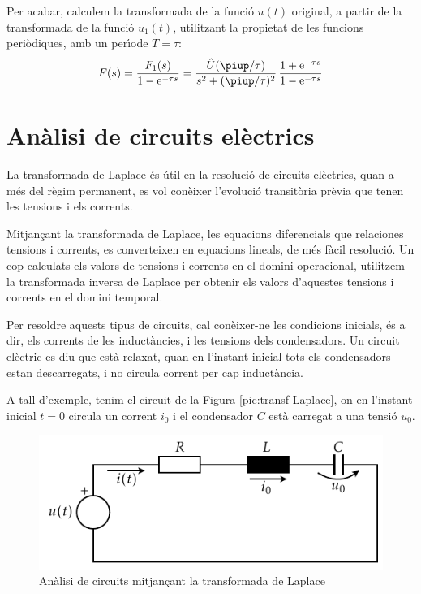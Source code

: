 \begin{exemple}
Per acabar, calculem la transformada de la funci\'{o} $u(t)$ original, a
partir de la transformada de la funci\'{o} $u_1(t)$, utilitzant la
propietat de les funcions peri\`{o}diques, amb un per\'{\i}ode $T=\tau$:
\[
    F(s) = \frac{F_1(s)}{1-\eu^{-\tau s}} =
    \frac{\hat{U} (\piup/\tau) }{s^2 + (\piup/\tau)^2}\,\frac{1+\eu^{-\tau s}}{1-\eu^{-\tau
    s}}
\]

\end{exemple}

\section{An\`{a}lisi de circuits el\`{e}ctrics}

La transformada de Laplace \'{e}s \'{u}til en la resoluci\'{o} de circuits
el\`{e}ctrics, quan a m\'{e}s del r\`{e}gim permanent, es vol con\`{e}ixer
l'evoluci\'{o} transit\`{o}ria pr\`{e}via que tenen les tensions i els corrents.

Mitjan\c{c}ant la transformada de Laplace, les equacions diferencials
que relaciones tensions i corrents, es converteixen en equacions
lineals, de m\'{e}s f\`{a}cil resoluci\'{o}. Un cop calculats els valors de
tensions i corrents en el domini operacional, utilitzem la
transformada inversa de Laplace per obtenir els valors d'aquestes
tensions i corrents en el domini temporal.

Per resoldre aquests tipus de circuits, cal con\`{e}ixer-ne les
condicions inicials, \'{e}s a dir, els corrents de les induct\`{a}ncies, i
les tensions dels condensadors. Un circuit el\`{e}ctric es diu que est\`{a}
relaxat, quan en l'instant inicial tots els condensadors estan
descarregats, i no circula corrent per cap induct\`{a}ncia.

A tall d'exemple, tenim el circuit de la Figura
\vref{pic:transf-Laplace}, on en l'instant inicial $t=0$ circula un
corrent $i_0$ i el condensador $C$ est\`{a} carregat a una tensi\'{o} $u_0$.
\begin{figure}[h]
\centering
    \includegraphics{Imatges/Cap-Laplace-Circuit-RLC.pdf}
\caption{An\`{a}lisi de circuits mitjan\c{c}ant la transformada de Laplace}
\label{pic:transf-Laplace}
\end{figure}


